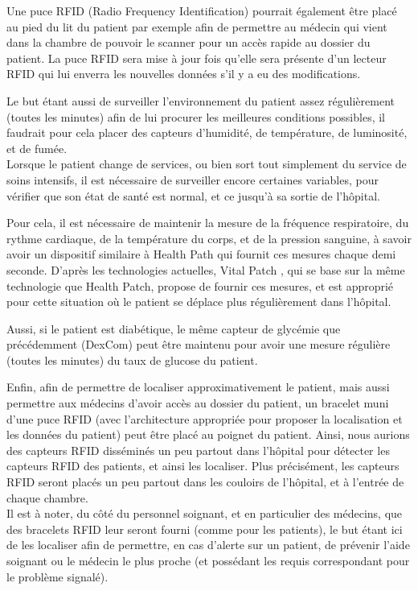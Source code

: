 \documentclass{article}
\begin{document}
Une puce RFID (Radio Frequency Identification) \cite{RFID} pourrait également être placé au pied du lit du patient par exemple afin de permettre au médecin qui vient dans la chambre de pouvoir le scanner pour un accès rapide au dossier du patient. La puce RFID sera mise à jour fois qu’elle sera présente d’un lecteur RFID qui lui enverra les nouvelles données s’il y a eu des modifications.

Le but étant aussi de surveiller l’environnement du patient assez régulièrement (toutes les minutes) afin de lui procurer les meilleures conditions possibles, il faudrait pour cela placer des capteurs d’humidité, de température, de luminosité, \cite{HTL} et de fumée. 
\\

Lorsque le patient change de services, ou bien sort tout simplement du service de soins intensifs, il est nécessaire de surveiller encore certaines variables, pour vérifier que son état de santé est normal, et ce jusqu’à sa sortie de l’hôpital. 

Pour cela, il est nécessaire de maintenir la mesure de la fréquence respiratoire, du rythme cardiaque, de la température du corps, et de la pression sanguine, à savoir avoir un dispositif similaire à Health Path qui fournit ces mesures chaque demi seconde. D’après les technologies actuelles, Vital Patch \cite{VitalPatch}, qui se base sur la même technologie que Health Patch, propose de fournir ces mesures, et est approprié pour cette situation où le patient se déplace plus régulièrement dans l’hôpital.

Aussi, si le patient est diabétique, le même capteur de glycémie que précédemment (DexCom) peut être maintenu pour avoir une mesure régulière (toutes les minutes) du taux de glucose du patient.

Enfin, afin de permettre de localiser approximativement le patient, mais aussi permettre aux médecins d’avoir accès au dossier du patient, un bracelet muni d’une puce RFID (avec l’architecture appropriée pour proposer la localisation et les données du patient) peut être placé au poignet du patient. Ainsi, nous aurions des capteurs RFID disséminés un peu partout dans l’hôpital pour détecter les capteurs RFID des patients, et ainsi les localiser. Plus précisément, les capteurs RFID seront placés un peu partout dans les couloirs de l’hôpital, et à l’entrée de chaque chambre.
\\

Il est à noter, du côté du personnel soignant, et en particulier des médecins, que des bracelets RFID \cite{BraceletRFID} leur seront fourni (comme pour les patients), le but étant ici de les localiser afin de permettre, en cas d’alerte sur un patient, de prévenir l’aide soignant ou le médecin le plus proche (et possédant les requis correspondant pour le problème signalé).
\end{document}
